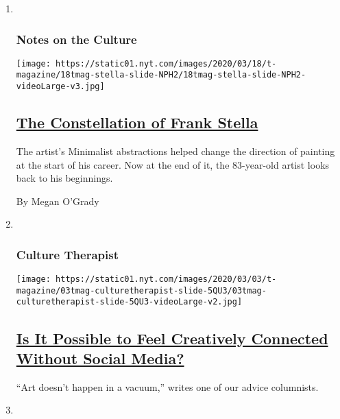 \begin{enumerate}
\def\labelenumi{\arabic{enumi}.}
\item ~
  \hypertarget{notes-on-the-culture}{%
  \subsubsection{Notes on the Culture}\label{notes-on-the-culture}}

  \texttt{[image: https://static01.nyt.com/images/2020/03/18/t-magazine/18tmag-stella-slide-NPH2/18tmag-stella-slide-NPH2-videoLarge-v3.jpg]}

  \hypertarget{the-constellation-of-frank-stella}{%
  \subsection{\texorpdfstring{\href{/2020/03/18/t-magazine/frank-stella.html}{The
  Constellation of Frank
  Stella}}{The Constellation of Frank Stella}}\label{the-constellation-of-frank-stella}}

  The artist's Minimalist abstractions helped change the direction of
  painting at the start of his career. Now at the end of it, the
  83-year-old artist looks back to his beginnings.

  By Megan O'Grady
\item ~
  \hypertarget{culture-therapist}{%
  \subsubsection{Culture Therapist}\label{culture-therapist}}

  \texttt{[image: https://static01.nyt.com/images/2020/03/03/t-magazine/03tmag-culturetherapist-slide-5QU3/03tmag-culturetherapist-slide-5QU3-videoLarge-v2.jpg]}

  \hypertarget{is-it-possible-to-feel-creatively-connected-without-social-media}{%
  \subsection{\texorpdfstring{\href{/2020/03/04/t-magazine/artists-creativity-social-media.html}{Is
  It Possible to Feel Creatively Connected Without Social
  Media?}}{Is It Possible to Feel Creatively Connected Without Social Media?}}\label{is-it-possible-to-feel-creatively-connected-without-social-media}}

  ``Art doesn't happen in a vacuum,'' writes one of our advice
  columnists.
\item ~
  \hypertarget{arts-and-letters}{%
}
\end{enumerate}
